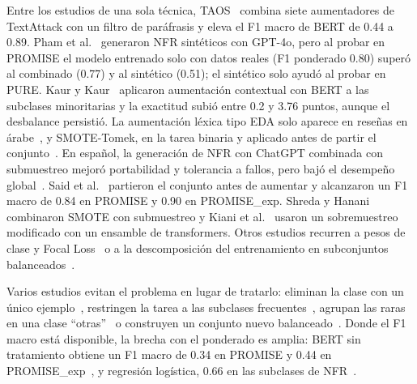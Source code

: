 \documentclass[conference]{IEEEtran}
\begin{document}
Entre los estudios de una sola técnica, TAOS~\cite{BenAmmar2025-TAOS} combina siete aumentadores de TextAttack con un filtro de paráfrasis y eleva el F1 macro de BERT de 0.44 a 0.89. Pham et al.~\cite{Pham2025-Generating} generaron NFR sintéticos con GPT-4o, pero al probar en PROMISE el modelo entrenado solo con datos reales (F1 ponderado 0.80) superó al combinado (0.77) y al sintético (0.51); el sintético solo ayudó al probar en PURE. Kaur y Kaur~\cite{Kaur2026-Hybrid} aplicaron aumentación contextual con BERT a las subclases minoritarias y la exactitud subió entre 0.2 y 3.76 puntos, aunque el desbalance persistió. La aumentación léxica tipo EDA solo aparece en reseñas en árabe~\cite{Yahya2023-Novel}, y SMOTE-Tomek, en la tarea binaria y aplicado antes de partir el conjunto~\cite{Abbas2024-Enscl}. En español, la generación de NFR con ChatGPT combinada con submuestreo mejoró portabilidad y tolerancia a fallos, pero bajó el desempeño global~\cite{Limaylla2025-Spanish}. Said et al.~\cite{Said2026-Intelligent} partieron el conjunto antes de aumentar y alcanzaron un F1 macro de 0.84 en PROMISE y 0.90 en PROMISE\_exp. Shreda y Hanani~\cite{Shreda2025-Identifying} combinaron SMOTE con submuestreo y Kiani et al.~\cite{Kiani2026-DeepLearning} usaron un sobremuestreo modificado con un ensamble de transformers. Otros estudios recurren a pesos de clase y Focal Loss~\cite{Nagaraju2026-Hierarchical,Alhaizaey2025-AgilePLM,Almohammady2026-Context} o a la descomposición del entrenamiento en subconjuntos balanceados~\cite{Binkhonain2023-Machine}.

Varios estudios evitan el problema en lugar de tratarlo: eliminan la clase con un único ejemplo~\cite{Toth2018-Study,Rahman2026-RequiBERT}, restringen la tarea a las subclases frecuentes~\cite{Li2022-Automatic,Kaur2022-Bert,Shafikuzzaman2025-Effectiveness}, agrupan las raras en una clase ``otras''~\cite{Kaur2023-Improving} o construyen un conjunto nuevo balanceado~\cite{Li2022-Automatically}. Donde el F1 macro está disponible, la brecha con el ponderado es amplia: BERT sin tratamiento obtiene un F1 macro de 0.34 en PROMISE y 0.44 en PROMISE\_exp~\cite{Aryan2025-Multi}, y regresión logística, 0.66 en las subclases de NFR~\cite{Nagaraju2026-Hierarchical}.
\end{document}
